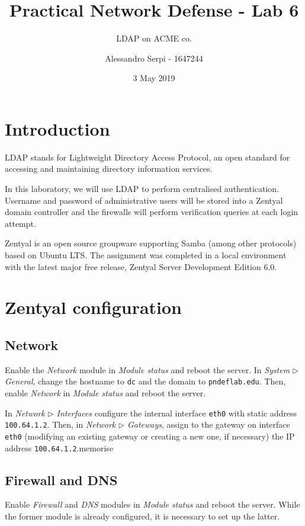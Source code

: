 \documentclass{homework}
\title{Practical Network Defense - Lab 6}
\subtitle{LDAP on ACME co.}
\author{Alessandro Serpi - 1647244}
\date{3 May 2019}
\begin{document}
    \maketitle
    \tableofcontents
    
    
    \pagebreak
    \section{Introduction}
    LDAP stands for Lightweight Directory Access Protocol, an open standard for accessing and maintaining directory information services.
    
    In this laboratory, we will use LDAP to perform centralised authentication.
    Username and password of administrative users will be stored into a Zentyal domain controller and the firewalls will perform verification queries at each login attempt.
    
    Zentyal is an open source groupware supporting Samba (among other protocols) based on Ubuntu LTS.
    The assignment was completed in a local environment with the  latest major free release, Zentyal Server Development Edition 6.0.
    
    
    \section{Zentyal configuration}
    \subsection{Network}
    Enable the \textit{Network} module in \textit{Module status} and reboot the server.
    In \textit{System} $\triangleright$ \textit{General}, change the hostname to \texttt{dc} and the domain to \texttt{pndeflab.edu}.
    Then, enable \textit{Network} in \textit{Module status} and reboot the server.
    
    In \textit{Network} $\triangleright$ \textit{Interfaces} configure the internal interface \texttt{eth0} with static address \texttt{100.64.1.2}. 
    Then, in \textit{Network} $\triangleright$ \textit{Gateways}, assign to the gateway on interface \texttt{eth0} (modifying an existing gateway or creating a new one, if necessary) the IP address \texttt{100.64.1.2}.memorise
        
    \subsection{Firewall and DNS}
    Enable \textit{Firewall} and \textit{DNS} modules in \textit{Module status} and reboot the server.
    While the former module is already configured, it is necessary to set up the latter.
    
\end{document}
